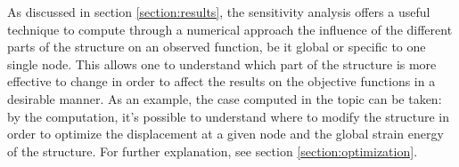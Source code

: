 As discussed in section \ref{section:results}, the sensitivity analysis offers a useful technique to compute through a numerical approach the influence of the different parts of the structure on an observed function, be it global or specific to one single node. This allows one to understand which part of the structure is more effective to change in order to affect the results on the objective functions in a desirable manner. As an example, the case computed in the topic can be taken: by the computation, it's possible to understand where to modify the structure in order to optimize the displacement at a given node and the global strain energy of the structure. For further explanation, see section \ref{section:optimization}.
\\[3pt]
